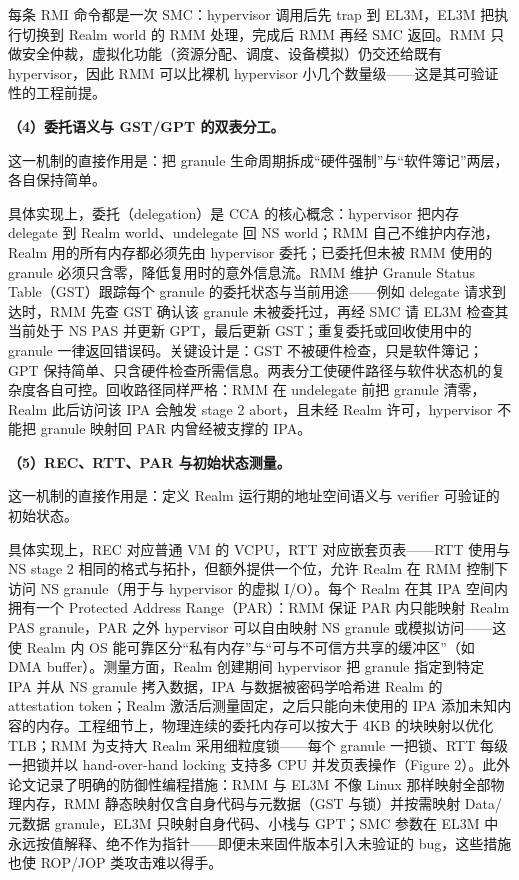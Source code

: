 \documentclass[11pt]{ctexart}
\begin{document}
每条 RMI 命令都是一次 SMC：hypervisor 调用后先 trap 到 EL3M，EL3M 把执行切换到 Realm world 的 RMM 处理，完成后 RMM 再经 SMC 返回。RMM 只做安全仲裁，虚拟化功能（资源分配、调度、设备模拟）仍交还给既有 hypervisor，因此 RMM 可以比裸机 hypervisor 小几个数量级——这是其可验证性的工程前提。\par
\noindent\textbf{（4）委托语义与 GST/GPT 的双表分工。}\par
这一机制的直接作用是：把 granule 生命周期拆成“硬件强制”与“软件簿记”两层，各自保持简单。\par
具体实现上，委托（delegation）是 CCA 的核心概念：hypervisor 把内存 delegate 到 Realm world、undelegate 回 NS world；RMM 自己不维护内存池，Realm 用的所有内存都必须先由 hypervisor 委托；已委托但未被 RMM 使用的 granule 必须只含零，降低复用时的意外信息流。RMM 维护 Granule Status Table（GST）跟踪每个 granule 的委托状态与当前用途——例如 delegate 请求到达时，RMM 先查 GST 确认该 granule 未被委托过，再经 SMC 请 EL3M 检查其当前处于 NS PAS 并更新 GPT，最后更新 GST；重复委托或回收使用中的 granule 一律返回错误码。关键设计是：GST 不被硬件检查，只是软件簿记；GPT 保持简单、只含硬件检查所需信息。两表分工使硬件路径与软件状态机的复杂度各自可控。回收路径同样严格：RMM 在 undelegate 前把 granule 清零，Realm 此后访问该 IPA 会触发 stage 2 abort，且未经 Realm 许可，hypervisor 不能把 granule 映射回 PAR 内曾经被支撑的 IPA。\par
\noindent\textbf{（5）REC、RTT、PAR 与初始状态测量。}\par
这一机制的直接作用是：定义 Realm 运行期的地址空间语义与 verifier 可验证的初始状态。\par
具体实现上，REC 对应普通 VM 的 VCPU，RTT 对应嵌套页表——RTT 使用与 NS stage 2 相同的格式与拓扑，但额外提供一个位，允许 Realm 在 RMM 控制下访问 NS granule（用于与 hypervisor 的虚拟 I/O）。每个 Realm 在其 IPA 空间内拥有一个 Protected Address Range（PAR）：RMM 保证 PAR 内只能映射 Realm PAS granule，PAR 之外 hypervisor 可以自由映射 NS granule 或模拟访问——这使 Realm 内 OS 能可靠区分“私有内存”与“可与不可信方共享的缓冲区”（如 DMA buffer）。测量方面，Realm 创建期间 hypervisor 把 granule 指定到特定 IPA 并从 NS granule 拷入数据，IPA 与数据被密码学哈希进 Realm 的 attestation token；Realm 激活后测量固定，之后只能向未使用的 IPA 添加未知内容的内存。工程细节上，物理连续的委托内存可以按大于 4KB 的块映射以优化 TLB；RMM 为支持大 Realm 采用细粒度锁——每个 granule 一把锁、RTT 每级一把锁并以 hand-over-hand locking 支持多 CPU 并发页表操作（Figure 2）。此外论文记录了明确的防御性编程措施：RMM 与 EL3M 不像 Linux 那样映射全部物理内存，RMM 静态映射仅含自身代码与元数据（GST 与锁）并按需映射 Data/元数据 granule，EL3M 只映射自身代码、小栈与 GPT；SMC 参数在 EL3M 中永远按值解释、绝不作为指针——即便未来固件版本引入未验证的 bug，这些措施也使 ROP/JOP 类攻击难以得手。\par
\end{document}
